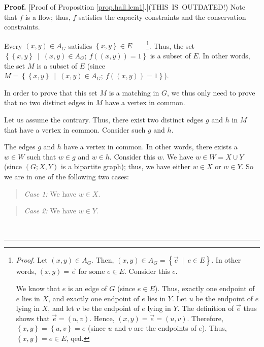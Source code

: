 \documentclass[numbers=enddot,12pt,final,onecolumn,notitlepage]{scrartcl}%
\theoremstyle{definition}
\newenvironment{statement}{\begin{quote}}{\end{quote}}
\newenvironment{proof}[1][Proof]{\noindent\textbf{#1.} }{\ \rule{0.5em}{0.5em}}
\newenvironment{noncompile}{}{}
\begin{document}
\begin{noncompile}
\begin{proof}
[Proof of Proposition \ref{prop.hall.lem1}.](THIS\ IS\ OUTDATED!) Note that
$f$ is a flow; thus, $f$ satisfies the capacity constraints and the
conservation constraints.

Every $\left(  x,y\right)  \in A_{G}$ satisfies $\left\{  x,y\right\}  \in
E$\ \ \ \ \footnote{\textit{Proof.} Let $\left(  x,y\right)  \in A_{G}$. Then,
$\left(  x,y\right)  \in A_{G}=\left\{  \overrightarrow{e}\ \mid\ e\in
E\right\}  $. In other words, $\left(  x,y\right)  =\overrightarrow{e}$ for
some $e\in E$. Consider this $e$.
\par
We know that $e$ is an edge of $G$ (since $e\in E$). Thus, exactly one
endpoint of $e$ lies in $X$, and exactly one endpoint of $e$ lies in $Y$. Let
$u$ be the endpoint of $e$ lying in $X$, and let $v$ be the endpoint of $e$
lying in $Y$. The definition of $\overrightarrow{e}$ thus shows that
$\overrightarrow{e}=\left(  u,v\right)  $. Hence, $\left(  x,y\right)
=\overrightarrow{e}=\left(  u,v\right)  $. Therefore, $\left\{  x,y\right\}
=\left\{  u,v\right\}  =e$ (since $u$ and $v$ are the endpoints of $e$). Thus,
$\left\{  x,y\right\}  =e\in E$, qed.}. Thus, the set \newline$\left\{
\left\{  x,y\right\}  \ \mid\ \left(  x,y\right)  \in A_{G};\ f\left(  \left(
x,y\right)  \right)  =1\right\}  $ is a subset of $E$. In other words, the set
$M$ is a subset of $E$ (since $M=\left\{  \left\{  x,y\right\}  \ \mid
\ \left(  x,y\right)  \in A_{G};\ f\left(  \left(  x,y\right)  \right)
=1\right\}  $).

In order to prove that this set $M$ is a matching in $G$, we thus only need to
prove that no two distinct edges in $M$ have a vertex in common.

Let us assume the contrary. Thus, there exist two distinct edges $g$ and $h$
in $M$ that have a vertex in common. Consider such $g$ and $h$.

The edges $g$ and $h$ have a vertex in common. In other words, there exists a
$w\in W$ such that $w\in g$ and $w\in h$. Consider this $w$. We have $w\in
W=X\cup Y$ (since $\left(  G;X,Y\right)  $ is a bipartite graph); thus, we
have either $w\in X$ or $w\in Y$. So we are in one of the following two cases:

\begin{statement}
\textit{Case 1:} We have $w\in X$.
\end{statement}

\begin{statement}
\textit{Case 2:} We have $w\in Y$.
\end{statement}


\end{proof}
\end{noncompile}
\end{document}

